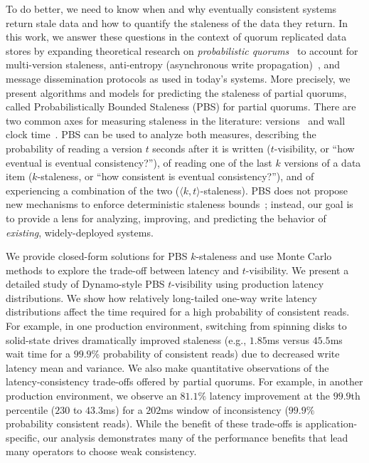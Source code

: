 \documentclass{vldb}
\begin{document}
To do better, we need to know when and why eventually consistent
systems return stale data and how to quantify the staleness of the
data they return.  In this work, we answer these questions in the
context of quorum replicated data stores by expanding theoretical
research on \textit{probabilistic quorums}~\cite{prob-quorum,
  quorum-overview} to account for multi-version staleness,
anti-entropy (asynchronous write propagation)~\cite{antientropy}, and
message dissemination protocols as used in today's systems.  More
precisely, we present algorithms and models for predicting the
staleness of partial quorums, called Probabilistically Bounded
Staleness (PBS) for partial quorums. There are two common axes for
measuring staleness in the literature: versions~\cite{podc-hpl, aqua,
  frac} and wall clock time~\cite{podc-hpl, vahdat-article,
  vahdat-bounded}.  PBS can be used to analyze both measures,
describing the probability of reading a version $t$ seconds after it
is written ($t$-visibility, or ``how eventual is eventual
consistency?''), of reading one of the last $k$ versions of a data
item ($k$-staleness, or ``how consistent is eventual consistency?''),
and of experiencing a combination of the two ($\langle k, t
\rangle$-staleness). PBS does not propose new mechanisms to enforce
deterministic staleness bounds~\cite{ aqua, trapp,vahdat-article,
  vahdat-bounded, frac}; instead, our goal is to provide a lens for
analyzing, improving, and predicting the behavior of
\textit{existing}, widely-deployed systems.

We provide closed-form solutions for PBS $k$-staleness and use Monte
Carlo methods to explore the trade-off between latency and
$t$-visibility.  We present a detailed study of Dynamo-style PBS
$t$-visibility using production latency distributions. We show how
relatively long-tailed one-way write latency distributions affect the
time required for a high probability of consistent reads.  For
example, in one production environment, switching from spinning disks
to solid-state drives dramatically improved staleness (e.g., $1.85$ms
versus $45.5$ms wait time for a $99.9$\% probability of consistent
reads) due to decreased write latency mean and variance.  We also make
quantitative observations of the latency-consistency trade-offs
offered by partial quorums.  For example, in another production
environment, we observe an $81.1\%$ latency improvement at the
$99.9$th percentile ($230$ to $43.3$ms) for a $202$ms window of
inconsistency ($99.9\%$ probability consistent reads).  While the
benefit of these trade-offs is application-specific, our analysis
demonstrates many of the performance benefits that lead many operators
to choose weak consistency.
\end{document}
